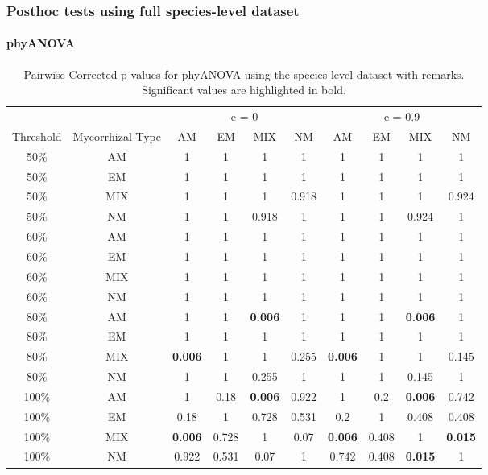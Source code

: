 \documentclass[]{article}
\let\oldparagraph\paragraph
\renewcommand{\paragraph}[1]{\oldparagraph{#1}\mbox{}}
\begin{document}
\hypertarget{posthoc-tests-using-full-species-level-dataset}{%
\subsubsection{Posthoc tests using full species-level
dataset}\label{posthoc-tests-using-full-species-level-dataset}}

\hypertarget{phyanova-3}{%
\paragraph{phyANOVA}\label{phyanova-3}}

\begin{table}[H]

\caption{\label{tab:unnamed-chunk-14}Pairwise Corrected p-values for phyANOVA using the species-level dataset with remarks. Significant values are highlighted in bold.}
\centering
\begin{tabular}{c|c|c|c|c|c|c|c|c|c}
\hline
\multicolumn{2}{c|}{ } & \multicolumn{4}{c|}{e = 0} & \multicolumn{4}{c}{e = 0.9} \\
\cline{3-6} \cline{7-10}
Threshold & Mycorrhizal Type & AM & EM & MIX & NM & AM & EM & MIX & NM\\
\hline
50\% & AM & 1 & 1 & 1 & 1 & 1 & 1 & 1 & 1\\
\hline
50\% & EM & 1 & 1 & 1 & 1 & 1 & 1 & 1 & 1\\
\hline
50\% & MIX & 1 & 1 & 1 & 0.918 & 1 & 1 & 1 & 0.924\\
\hline
50\% & NM & 1 & 1 & 0.918 & 1 & 1 & 1 & 0.924 & 1\\
\hline
60\% & AM & 1 & 1 & 1 & 1 & 1 & 1 & 1 & 1\\
\hline
60\% & EM & 1 & 1 & 1 & 1 & 1 & 1 & 1 & 1\\
\hline
60\% & MIX & 1 & 1 & 1 & 1 & 1 & 1 & 1 & 1\\
\hline
60\% & NM & 1 & 1 & 1 & 1 & 1 & 1 & 1 & 1\\
\hline
80\% & AM & 1 & 1 & \textbf{0.006} & 1 & 1 & 1 & \textbf{0.006} & 1\\
\hline
80\% & EM & 1 & 1 & 1 & 1 & 1 & 1 & 1 & 1\\
\hline
80\% & MIX & \textbf{0.006} & 1 & 1 & 0.255 & \textbf{0.006} & 1 & 1 & 0.145\\
\hline
80\% & NM & 1 & 1 & 0.255 & 1 & 1 & 1 & 0.145 & 1\\
\hline
100\% & AM & 1 & 0.18 & \textbf{0.006} & 0.922 & 1 & 0.2 & \textbf{0.006} & 0.742\\
\hline
100\% & EM & 0.18 & 1 & 0.728 & 0.531 & 0.2 & 1 & 0.408 & 0.408\\
\hline
100\% & MIX & \textbf{0.006} & 0.728 & 1 & 0.07 & \textbf{0.006} & 0.408 & 1 & \textbf{0.015}\\
\hline
100\% & NM & 0.922 & 0.531 & 0.07 & 1 & 0.742 & 0.408 & \textbf{0.015} & 1\\
\hline
\end{tabular}
\end{table}
\end{document}
